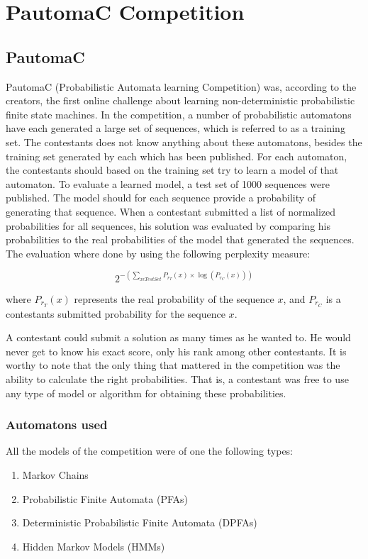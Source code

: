 \section{PautomaC Competition}

\subsection{PautomaC}
PautomaC (Probabilistic Automata learning Competition) was, according to the creators, the first online challenge about learning non-deterministic probabilistic finite state machines.
In the competition, a number of probabilistic automatons have each generated a large set of sequences, which is referred to as a training set.
The contestants does not know anything about these automatons, besides the training set generated by each which has been published.
For each automaton, the contestants should based on the training set try to learn a model of that automaton.
To evaluate a learned model, a test set of 1000 sequences were published. The model should for each sequence provide a probability of generating that sequence. When a contestant submitted a list of normalized probabilities for all sequences, his solution was evaluated by comparing his probabilities to the real probabilities of the model that generated the sequences.
The evaluation where done by using the following perplexity measure:

\begin{equation} \label{eq:perplexity}
2^{-(\sum_{x\epsilon TestSet}P_{r_{T}}(x)\times\log(P_{r_{C}}(x)))}
\end{equation}

where $P_{r_{T}}(x)$ represents the real probability of the
sequence $x$, and $P_{r_{C}}$ is a contestants submitted probability for the sequence $x$.

A contestant could submit a solution as many times as he wanted to. He would never get to know his exact score, only his rank among other contestants.
It is worthy to note that the only thing that mattered in the competition was the ability to calculate the right probabilities.
That is, a contestant was free to use any type of model or algorithm for obtaining these probabilities.

\subsubsection{Automatons used}

All the models of the competition were of one the following types:
\begin{enumerate}
\item Markov Chains
\item Probabilistic Finite Automata (PFAs)
\item Deterministic Probabilistic Finite Automata (DPFAs)
\item Hidden Markov Models (HMMs)
\end{enumerate}

